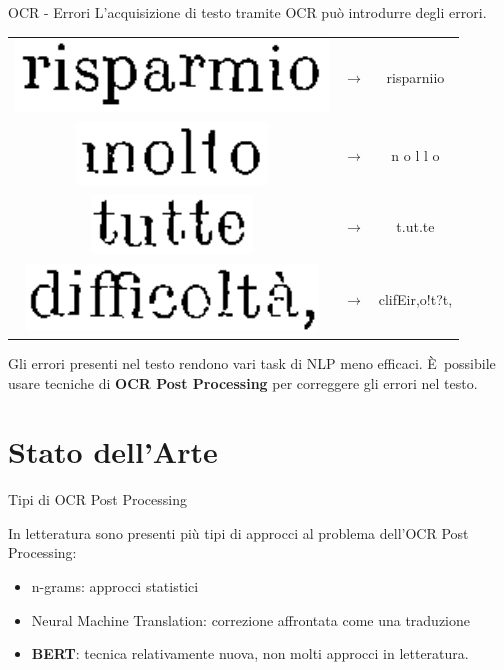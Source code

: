 \documentclass{beamer}
\newcommand{\E}{È}
\begin{document}
\begin{frame}{OCR - Errori}
	L'acquisizione di testo tramite OCR può introdurre degli errori.
	\begin{table}
	\begin{tabular}{ccc}
	\adjustbox{valign=c} {\includegraphics[height=.5cm]{images/slides/risparmio}} &
	$ \rightarrow $ & risparniio \\
	\adjustbox{valign=c} {\includegraphics[height=.5cm]{images/slides/molto}} &
	$ \rightarrow $ & n o l l o \\
	\adjustbox{valign=c} {\includegraphics[height=.5cm]{images/slides/tutte}} &
	$ \rightarrow $ & t.ut.te \\
	\adjustbox{valign=c} {\includegraphics[height=.5cm]{images/slides/difficolta}} &
	$ \rightarrow $ & clifEir,o!t?t, \\
	\end{tabular}
	\end{table}	
	
Gli errori presenti nel testo rendono vari task di NLP meno efficaci.
\newline \newline
\E\ possibile usare tecniche di \textbf{OCR Post Processing} per correggere gli errori nel testo.
	
	
\end{frame}
\section{Stato dell'Arte}
\begin{frame}{Tipi di OCR Post Processing}
	
In letteratura sono presenti più tipi di approcci al problema dell'OCR Post Processing:
\begin{itemize}
\item n-grams: approcci statistici
\item Neural Machine Translation: correzione affrontata come una traduzione
\item \textbf{BERT}: tecnica relativamente nuova, non molti approcci in letteratura.

\end{itemize}
	
\end{frame}
\end{document}
